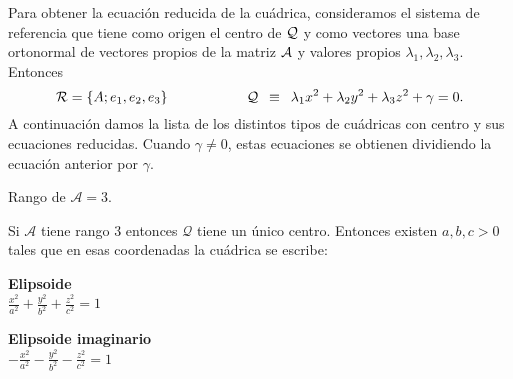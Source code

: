 \documentclass[11pt, a4paper]{article}
\newif\IfInSansMode
\let\oldsf\sffamily
\renewcommand*{\sffamily}{\oldsf\mathversion{sans}\InSansModetrue}
\theoremstyle{theorem-style}
\theoremstyle{definition-style}
\theoremstyle{remark-style}
\theoremstyle{example-style}
\begin{document}
Para obtener la ecuaci\'on reducida de la cu\'adrica, consideramos el sistema de referencia que tiene como origen el centro de $\cal Q$ y como vectores una base ortonormal de vectores propios de la matriz $\cal A$ y valores propios $\lambda_1,\lambda_2,\lambda_3$. Entonces
\[
{\cal R} =\{A; {e}_1, {e}_2, {e}_3 \}
\hspace{2cm}
{\cal Q} \, \, \, \equiv \, \, \, \lambda_1 {x}^2 +\lambda_2 {y}^2 +\lambda_3 {z}^2 +
{\gamma} = 0.
\]
A continuaci\'on damos la lista de los distintos tipos de cu\'adricas con centro y  sus ecuaciones reducidas. Cuando ${\gamma}\neq 0$, estas ecuaciones se obtienen dividiendo la ecuaci\'on anterior por ${\gamma}$. 

Rango de $\mathcal A = 3$.

Si $\mathcal A$ tiene rango $3$ entonces $\mathcal Q$ tiene un único centro.
Entonces existen $a,b,c > 0$ tales que en esas coordenadas la cuádrica se escribe: 

\begin{minipage}[c]{0.45\textwidth}
  {\bf Elipsoide}\vspace{1em}\\
  $\displaystyle \frac{{x}^2}{a^2} + \frac{{y}^2}{b^2}+\frac{{z}^2}{c^2} = 1$
\end{minipage}\hfill
\begin{minipage}[]{0.45\textwidth}

\end{minipage}

\begin{minipage}[c]{0.45\textwidth}
  {\bf Elipsoide imaginario}\vspace{1em}\\
  $\displaystyle -\frac{{x}^2}{a^2} - \frac{{y}^2}{b^2} - \frac{{z}^2}{c^2} = 1$
\end{minipage}\hfill
\begin{minipage}[]{0.45\textwidth}
\hfill
\end{minipage}
\end{document}

